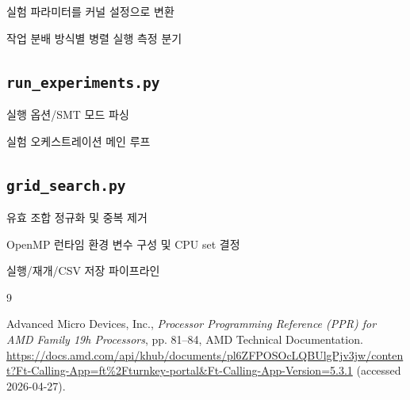 \documentclass[11pt,a4paper]{article}
\begin{document}
실험 파라미터를 커널 설정으로 변환


작업 분배 방식별 병렬 실행 측정 분기


\subsection{\texttt{run\_experiments.py}}
실행 옵션/SMT 모드 파싱


실험 오케스트레이션 메인 루프


\subsection{\texttt{grid\_search.py}}
유효 조합 정규화 및 중복 제거


OpenMP 런타임 환경 변수 구성 및 CPU set 결정



실행/재개/CSV 저장 파이프라인


\begin{thebibliography}{9}

Advanced Micro Devices, Inc.,
\emph{Processor Programming Reference (PPR) for AMD Family 19h Processors},
pp. 81--84,
AMD Technical Documentation.
\url{https://docs.amd.com/api/khub/documents/pl6ZFPOSOcLQBUlgPjv3jw/content?Ft-Calling-App=ft\%2Fturnkey-portal\&Ft-Calling-App-Version=5.3.1}
(accessed 2026-04-27).

\end{thebibliography}
\end{document}
